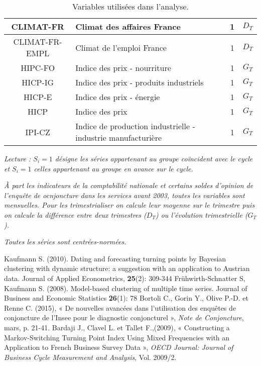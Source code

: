 \documentclass[10pt,french,french]{article}
\begin{document}
\begin{table}[h]
{\begin{tabular}{ | c | p{10cm} | c|c|}
     CLIMAT-FR & Climat des affaires France & 1 & $D_T$\\ \hline
     CLIMAT-FR-EMPL & Climat de l'emploi France  & 1 & $D_T$\\ \hline
     HIPC-FO & Indice des prix - nourriture & 1 & $G_T$\\ \hline
     HICP-IG & Indice des prix - produits industriels & 1 & $G_T$\\ \hline
     HICP-E & Indice des prix - énergie & 1 & $G_T$\\ \hline
     HICP & Indice des prix & 1 & $G_T$\\ \hline
     IPI-CZ & Indice de production industrielle - industrie manufacturière & 1& $G_T$ \\
     \hline
   \end{tabular}
   \caption{Variables utilisées dans l'analyse.}\label{tableau_var}}
  \footnotesize
\emph{%
Lecture : $S_i=1$ désigne les séries appartenant au groupe coïncident avec le cycle et $S_i=1$ celles appartenant au groupe en avance sur le cycle.}

\emph{%
À part les indicateurs de la comptabilité nationale et certains soldes d'opinion de l'enquête de ocnjoncture dans les services avant 2003, toutes les variables sont mensuelles. Pour les trimestrialiser on calcule leur moyenne sur le trimestre puis on calcule la différence entre deux trimestres ($D_T$) ou l'évolution trimestrielle ($G_T$).}

\emph{%
Toutes les séries sont centrées-normées.}
\end{table}

\newpage

\nocite{*}

\begin{thebibliography}{999}
 Kaufmann S. (2010). Dating and forecasting turning points by Bayesian clustering with dynamic structure: a suggestion with an application to Austrian data. Journal of Applied Econometrics, \textbf{25}(2): 309-344 
 Frühwirth-Schnatter S, Kaufmann S. (2008). Model-based clustering of multiple time series. Journal of Business and Economic Statistics \textbf{26}(1): 78
 Bortoli C., Gorin Y., Olive P.-D. et Renne C. (2015), « De nouvelles avancées dans l’utilisation des enquêtes de conjoncture de l’Insee pour le diagnostic conjoncturel », \emph{Note de Conjoncture}, mars, p. 21-41.
 Bardaji J., Clavel L. et Tallet F.,(2009), « Constructing a Markov-Switching Turning Point Index Using Mixed Frequencies with an Application to French Business Survey Data », \emph{OECD Journal: Journal of Business Cycle Measurement and Analysis}, Vol. 2009/2.
\end{thebibliography}
\end{document}
